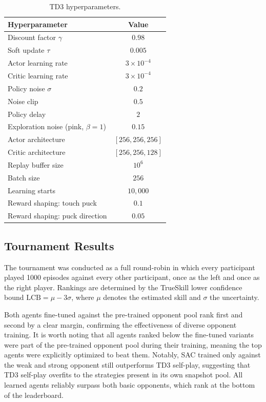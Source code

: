 \documentclass[11pt]{article}
\begin{document}
\begin{table}[htbp]
\centering
\caption{\ac{TD3} hyperparameters.}
\vspace{-0.3cm}
\label{tab:td3_hyperparams}
\begin{tabular}{lc}
\toprule
\textbf{Hyperparameter} & \textbf{Value} \\
\midrule
Discount factor $\gamma$         & $0.98$ \\
Soft update $\tau$               & $0.005$ \\
Actor learning rate              & $3 \times 10^{-4}$ \\
Critic learning rate             & $3 \times 10^{-4}$ \\
Policy noise $\sigma$            & $0.2$ \\
Noise clip                       & $0.5$ \\
Policy delay                     & $2$ \\
Exploration noise (pink, $\beta=1$) & $0.15$ \\
Actor architecture               & $[256, 256, 256]$ \\
Critic architecture              & $[256, 256, 128]$ \\
Replay buffer size               & $10^6$ \\
Batch size                       & $256$ \\
Learning starts                  & $10{,}000$ \\
Reward shaping: touch puck       & $0.1$ \\
Reward shaping: puck direction   & $0.05$ \\
\bottomrule
\end{tabular}
\end{table}

\newpage
\subsection{Tournament Results}

The tournament was conducted as a full round-robin in which every participant played 
1000 episodes against every other participant, once as the left and once as the right 
player. Rankings are determined by the TrueSkill lower confidence bound 
$\text{LCB} = \mu - 3\sigma$, where $\mu$ denotes the estimated skill and $\sigma$ 
the uncertainty.

\medskip
Both agents fine-tuned against the pre-trained opponent pool rank first and second by 
a clear margin, confirming the effectiveness of diverse opponent training. It is worth 
noting that all agents ranked below the fine-tuned variants were part of the pre-trained 
opponent pool during their training, meaning the top agents were explicitly optimized 
to beat them. Notably, \ac{SAC} trained only against the weak and strong opponent still 
outperforms \ac{TD3} self-play, suggesting that \ac{TD3} self-play overfits to the strategies 
present in its own snapshot pool. All learned agents reliably surpass both basic opponents, which rank at the bottom of the leaderboard.
\end{document}
